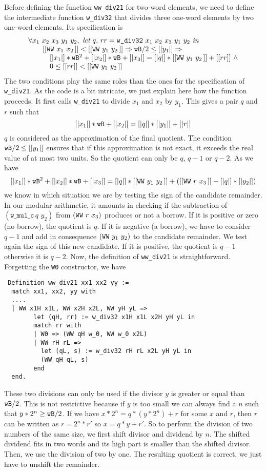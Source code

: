 Before defining the function {\tt ww\_div21} for two-word elements,
we need to define the intermediate function  {\tt w\_div32}
that divides three one-word elements by two one-word elements.
Its specification is
$$\begin{array}{l}
\forall x_1\,\, x_2\,\, x_3\,\, y_1\,\, y_2, \,\, \textit{let}\,\, q,\, rr = 
\texttt{w\_div32}\,\, x_1\,\, x_2\,\, x_3\,\, y_1\,\, y_2\,\, \textit{in}\\
 \hskip20pt [[\texttt{WW}\,\,x_1\,\,x_2\,]] < [[\texttt{WW}\,\,y_1\,\,y_2\,]] \Rightarrow 
 {\texttt{wB}} / 2 \le [|y_1|] \Rightarrow\\
 \hskip30pt [|x_1|] * {\texttt{wB}} ^ 2 + [|x_2|] * {\texttt{wB}}  + [|x_3|] =   [|q|] *  
 [[\texttt{WW}\,\,y_1\,\,y_2\,]] + [[rr]] \,\,\land  \\
 \hskip30pt 0 \le [[rr]] < [[\texttt{WW}\,\,y_1\,\,y_2\,]]
\end{array}
$$
The two conditions play the same roles than the ones for the specification of {\tt w\_div21}.
As the code is a bit intricate, we just explain here how the function
proceeds. It first calls {\tt w\_div21} to divide $x_1$ and $x_2$
by $y_1$. This gives a pair $q$ and $r$ such that
$$[|x_1|] * {\texttt{wB}} + [|x_2|] = [|q|] * [|y_1|] + [|r|]$$
$q$ is considered as the approximation of the final quotient.
The condition ${\texttt{wB}} / 2 \le [|y_1|]$ ensures that if this approximation
is not exact, it exceeds the real value of at most two units. So the quotient 
can only be $q$, $q - 1$ or $q - 2$. 
As we have 
$$[|x_1|] *  {\texttt{wB}} ^ 2  + [|x_2|] * {\texttt{wB}} + [|x_3|] = [|q|] * [[\texttt{WW}\,\,y_1\,\,y_2\,]] + ([[\texttt{WW}\,\,r\,\,x_3\,]] - [|q|] * [|y_2|])$$
we know in which situation we are by testing the sign of the candidate
remainder.
In our modular arithmetic, it amounts in checking if the subtraction of
$(\texttt{w\_mul\_c}\, q\,\, y_2)$ from $(\texttt{WW}\,\,r\,\,x_3\,\!)$
produces or not a borrow.  
If it is positive or zero (no borrow), the quotient is $q$. 
If it is negative (a borrow), 
we have to consider $q - 1$ and add in consequence $(\texttt{WW}\,\,y_1\,\,y_2\,\!)$ 
to the candidate remainder.
We test again the sign of this new candidate. 
If it is positive, the quotient is $q - 1$
otherwise it is $q - 2$.
Now, the definition of {\tt ww\_div21} is straightforward. 
Forgetting the {\tt W0}
constructor, we have
\begin{verbatim} 
 Definition ww_div21 xx1 xx2 yy :=
  match xx1, xx2, yy with
  ....  
  | WW x1H x1L, WW x2H x2L, WW yH yL =>
        let (qH, rr) := w_div32 x1H x1L x2H yH yL in
        match rr with
        | W0 => (WW qH w_0, WW w_0 x2L)
        | WW rH rL =>
          let (qL, s) := w_div32 rH rL x2L yH yL in
          (WW qH qL, s)
        end
  end.
\end{verbatim}
These two divisions can only be used if the divisor $y$ is greater or equal
than ${\texttt{wB}}/2$.
This is not restrictive
because if $y$ is too small we can always find a $n$ such that 
$y* 2 ^n \ge {\texttt{wB}}/2$. If we have $x * 2 ^ n  =  q  * (y * 2 ^ n) + r$ 
for some $x$ and $r$, then $r$ can be written as $r = 2^n * r'$ so
$x = q * y + r'$. So to perform the division of two numbers of the same size, 
we first shift divisor and dividend by $n$. 
The shifted dividend fits in two words and its high part is smaller
than the shifted divisor. Then, we use the division of two by one. 
The resulting quotient is correct, we just have to unshift the remainder.

